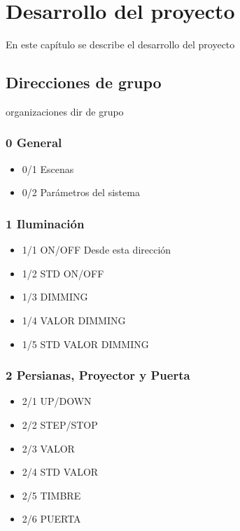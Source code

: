 \chapter{Desarrollo del proyecto}

En este capítulo se describe el desarrollo del proyecto

\section{Direcciones de grupo}

organizaciones dir de grupo

\subsection{0 General}

\begin{itemize}
\item{0/1 Escenas}
\item {0/2 Parámetros del sistema}
\end{itemize} 

\subsection{1 Iluminación}

\begin{itemize}
\item{1/1 ON/OFF}
Desde esta dirección
\item{1/2 STD ON/OFF}
\item{1/3 DIMMING}
\item{1/4 VALOR DIMMING}
\item{1/5 STD VALOR DIMMING}
\end{itemize} 

\subsection{2 Persianas, Proyector y Puerta}

\begin{itemize}
\item{2/1 UP/DOWN}
\item{2/2 STEP/STOP}
\item{2/3 VALOR}
\item{2/4 STD VALOR}
\item{2/5 TIMBRE}
\item{2/6 PUERTA}
\end{itemize} 

